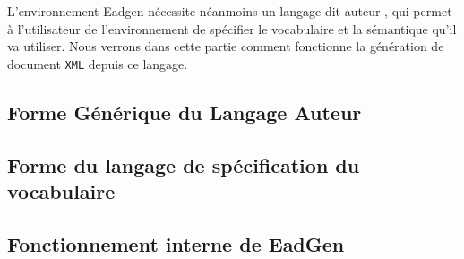 L'environnement Eadgen nécessite néanmoins un langage dit \og 
auteur \fg, qui permet à l'utilisateur de l'environnement de spécifier
le vocabulaire et la sémantique qu'il va utiliser. Nous verrons dans
cette partie comment fonctionne la génération de document \texttt{XML} depuis ce
langage. 

\subsection{Forme Générique du Langage Auteur}


\subsection{Forme du langage de spécification du vocabulaire}


\subsection{Fonctionnement interne de EadGen}

